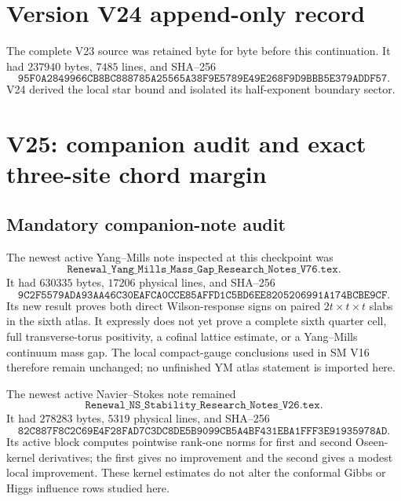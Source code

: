 \documentclass[11pt]{article}
\theoremstyle{remark}
\begin{document}
\section*{Version V24 append-only record}
The complete V23 source was retained byte for byte before this
continuation.  It had \(237940\) bytes, \(7485\) lines, and SHA--256
\[
 \texttt{95F0A2849966CB8BC888785A25565A38F9E5789E49E268F9D9BBB5E379ADDF57}.
\]
V24 derived the local star bound and isolated its half-exponent boundary
sector.


\section{V25: companion audit and exact three-site chord margin}
\label{sec:v17v25}

\subsection{Mandatory companion-note audit}

The newest active Yang--Mills note inspected at this checkpoint was
\[
 \texttt{Renewal\_Yang\_Mills\_Mass\_Gap\_Research\_Notes\_V76.tex}.
                                                               \tag{25.1}
\]
It had \(630335\) bytes, \(17206\) physical lines, and SHA--256
\[
 \texttt{9C2F5579ADA93AA46C30EAFCA0CCE85AFFD1C5BD6EE8205206991A174BCBE9CF}.
                                                               \tag{25.2}
\]
Its new result proves both direct Wilson-response signs on paired
\(2t\times t\times t\) slabs in the sixth atlas.  It expressly does not
yet prove a complete sixth quarter cell, full transverse-torus
positivity, a cofinal lattice estimate, or a Yang--Mills continuum mass
gap.  The local compact-gauge conclusions used in SM V16 therefore
remain unchanged; no unfinished YM atlas statement is imported here.

The newest active Navier--Stokes note remained
\[
 \texttt{Renewal\_NS\_Stability\_Research\_Notes\_V26.tex}.     \tag{25.3}
\]
It had \(278283\) bytes, \(5319\) physical lines, and SHA--256
\[
 \texttt{82C887F8C2C69E4F28FAD7C3DC8DE5B9099CB5A4BF431EBA1FFF3E91935978AD}.
                                                               \tag{25.4}
\]
Its active block computes pointwise rank-one norms for first and second
Oseen-kernel derivatives; the first gives no improvement and the second
gives a modest local improvement.  These kernel estimates do not alter
the conformal Gibbs or Higgs influence rows studied here.
\end{document}
